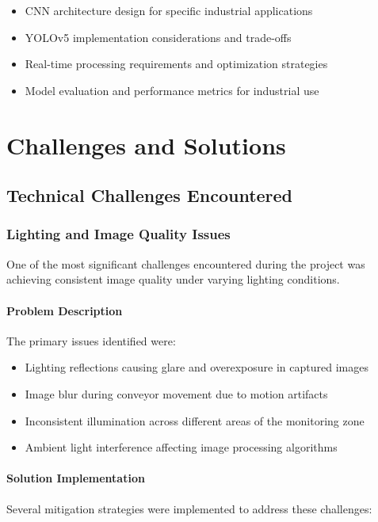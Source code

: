 \documentclass{book}
\begin{document}
\begin{itemize}
\item CNN architecture design for specific industrial applications
\item YOLOv5 implementation considerations and trade-offs
\item Real-time processing requirements and optimization strategies
\item Model evaluation and performance metrics for industrial use
\end{itemize}

\chapter{Challenges and Solutions}

\section{Technical Challenges Encountered}

\subsection{Lighting and Image Quality Issues}

\par\noindent One of the most significant challenges encountered during the project was achieving consistent image quality under varying lighting conditions.

\subsubsection{Problem Description}
\par\noindent The primary issues identified were:

\begin{itemize}
\item Lighting reflections causing glare and overexposure in captured images
\item Image blur during conveyor movement due to motion artifacts
\item Inconsistent illumination across different areas of the monitoring zone
\item Ambient light interference affecting image processing algorithms
\end{itemize}

\subsubsection{Solution Implementation}
\par\noindent Several mitigation strategies were implemented to address these challenges:
\end{document}
